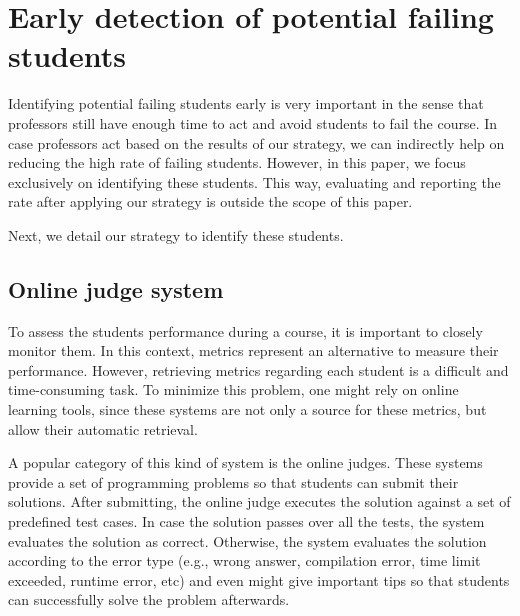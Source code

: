 \section{Early detection of potential failing students}

\label{sec:strategy}

Identifying potential failing students early is very important in the sense that professors still have enough time to act and avoid students to fail the course. In case professors act based on the results of our strategy, we can indirectly help on reducing the high rate of failing students. However, in this paper, we focus exclusively on identifying these students. This way, evaluating and reporting the rate after applying our strategy is outside the scope of this paper.

Next, we detail our strategy to identify these students.

\subsection{Online judge system}

To assess the students performance during a course, it is important to closely monitor them. In this context, metrics represent an alternative to measure their performance. However, retrieving metrics regarding each student is a difficult and time-consuming task. To minimize this problem, one might rely on online learning tools, since these systems are not only a source for these metrics, but allow their automatic retrieval. 

A popular category of this kind of system is the online judges. These systems provide a set of programming problems so that students can submit their solutions. After submitting, the online judge executes the solution against a set of predefined test cases. In case the solution passes over all the tests, the system evaluates the solution as correct. Otherwise, the system evaluates the solution according to the error type (e.g., wrong answer, compilation error, time limit exceeded, runtime error, etc) and even might give important tips so that students can successfully solve the problem afterwards.

